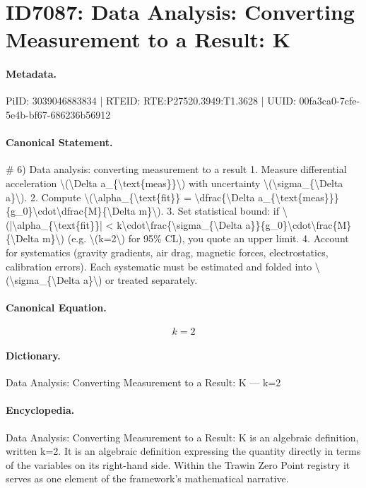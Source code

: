 \section*{ID7087: Data Analysis: Converting Measurement to a Result: K}
\paragraph{Metadata.}
PiID: 3039046883834 | RTEID: RTE:P27520.3949:T1.3628 | UUID: 00fa3ca0-7cfe-5e4b-bf67-686236b56912

\paragraph{Canonical Statement.}
\# 6) Data analysis: converting measurement to a result 1. Measure differential acceleration \textbackslash{}(\textbackslash{}Delta a\_\{\textbackslash{}text\{meas\}\}\textbackslash{}) with uncertainty \textbackslash{}(\textbackslash{}sigma\_\{\textbackslash{}Delta a\}\textbackslash{}). 2. Compute \textbackslash{}(\textbackslash{}alpha\_\{\textbackslash{}text\{fit\}\} = \textbackslash{}dfrac\{\textbackslash{}Delta a\_\{\textbackslash{}text\{meas\}\}\}\{g\_0\}\textbackslash{}cdot\textbackslash{}dfrac\{M\}\{\textbackslash{}Delta m\}\textbackslash{}). 3. Set statistical bound: if \textbackslash{}(|\textbackslash{}alpha\_\{\textbackslash{}text\{fit\}\}| < k\textbackslash{}cdot\textbackslash{}frac\{\textbackslash{}sigma\_\{\textbackslash{}Delta a\}\}\{g\_0\}\textbackslash{}cdot\textbackslash{}frac\{M\}\{\textbackslash{}Delta m\}\textbackslash{}) (e.g. \textbackslash{}(k=2\textbackslash{}) for 95\% CL), you quote an upper limit. 4. Account for systematics (gravity gradients, air drag, magnetic forces, electrostatics, calibration errors). Each systematic must be estimated and folded into \textbackslash{}(\textbackslash{}sigma\_\{\textbackslash{}Delta a\}\textbackslash{}) or treated separately.

\paragraph{Canonical Equation.}
\[
k=2
\]

\paragraph{Dictionary.}
Data Analysis: Converting Measurement to a Result: K — k=2

\paragraph{Encyclopedia.}
Data Analysis: Converting Measurement to a Result: K is an algebraic definition, written k=2. It is an algebraic definition expressing the quantity directly in terms of the variables on its right-hand side. Within the Trawin Zero Point registry it serves as one element of the framework's mathematical narrative.

